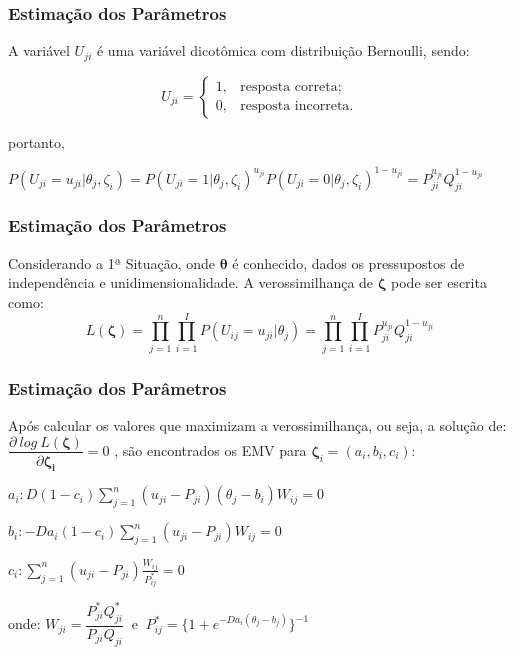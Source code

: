 \documentclass{beamer}
\begin{document}
	

	\begin{frame}
		
		\frametitle{Estimação dos Parâmetros }
		
		A variável $U_{ji}$ é uma variável dicotômica com distribuição Bernoulli, sendo:
		
		\[U_{ji} =    \begin{cases}
			
			1, & \mbox{resposta correta;}  \\
			
			0, & \mbox{resposta incorreta.}
			
		\end{cases}
		\]
		
		portanto,  
		
		$ \label{eq:bern}
			P(U_{ji} = u_{ji}|\theta_j, \zeta_i) = P(U_{ji} = 1|\theta_j, \zeta_i)^{u_{ji}}
			P(U_{ji} = 0|\theta_j, \zeta_i)^{1 - u_{ji}} = P_{ji}^{u_{ji}}Q_{ji}^{1-u_{ji}}
		$
	
	\end{frame}
	
	\begin{frame}
		
		\frametitle{Estimação dos Parâmetros }
		
		Considerando a 1ª Situação, onde $ \boldsymbol{\theta} $ é conhecido, dados os pressupostos de independência e unidimensionalidade. A verossimilhança de  $ \boldsymbol{\zeta} $ pode ser escrita como:
		\[
		L(\boldsymbol{\zeta}) =  \prod_{j=1}^{n}\prod_{i=1}^{I}P(U_{ij} = u_{ji}|\theta_j) = \prod_{j=1}^{n}\prod_{i=1}^{I}P_{ji}^{u_{ji}}Q_{ji}^{1-u_{ji}}
		\]
		
		
	\end{frame}
	
	\begin{frame}
		
		\frametitle{Estimação dos Parâmetros }
		
		Após calcular os valores que maximizam a verossimilhança, ou seja, a solução de: $\dfrac{\partial~log~ L(\boldsymbol{\zeta})}{\partial \boldsymbol{\zeta_i}} = 0$ , são encontrados os EMV para $ \boldsymbol{\zeta}_i = (a_i, b_i , c_i )$:\newline
		
		$
		a_i: D(1 - c_i)\sum_{j=1}^{n}(u_{ji} - P_{ji})(\theta_j - b_i)W_{ij} = 0
		$\newline
		
		$
		b_i: -Da_i(1 - c_i)\sum_{j=1}^{n}(u_{ji} - P_{ji})W_{ij} = 0
		$\newline
		
		$ 
		c_i: \sum_{j=1}^{n}(u_{ji} - P_{ji})\frac{W_{ij}}{P^*_{ij}} = 0
		$  \newline
		
		\begin{center} onde: \space
			$ W_{ji} = \dfrac{P_{ji}^*Q_{ji}^*}{P_{ji}Q_{ji}} ~$ e $ ~ 
			P^*_{ij} = \{1 + e^{-Da_i(\theta_j - b_j)}\}^{-1} $
		\end{center}

			
	\end{frame}
	
\end{document}
